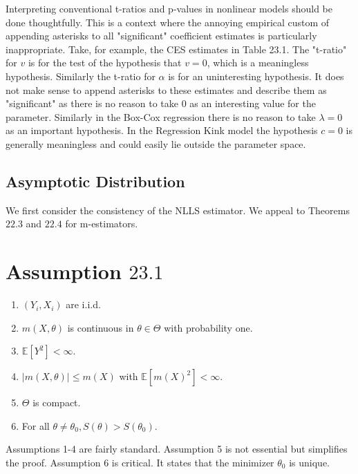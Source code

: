 \documentclass[10pt]{article}
\begin{document}
Interpreting conventional t-ratios and p-values in nonlinear models should be done thoughtfully. This is a context where the annoying empirical custom of appending asterisks to all "significant" coefficient estimates is particularly inappropriate. Take, for example, the CES estimates in Table 23.1. The "t-ratio" for $v$ is for the test of the hypothesis that $v=0$, which is a meaningless hypothesis. Similarly the t-ratio for $\alpha$ is for an uninteresting hypothesis. It does not make sense to append asterisks to these estimates and describe them as "significant" as there is no reason to take 0 as an interesting value for the parameter. Similarly in the Box-Cox regression there is no reason to take $\lambda=0$ as an important hypothesis. In the Regression Kink model the hypothesis $c=0$ is generally meaningless and could easily lie outside the parameter space.

\subsection{Asymptotic Distribution}
We first consider the consistency of the NLLS estimator. We appeal to Theorems $22.3$ and $22.4$ for m-estimators.

\section{Assumption $23.1$}
\begin{enumerate}
  \item $\left(Y_{i}, X_{i}\right)$ are i.i.d.

  \item $m(X, \theta)$ is continuous in $\theta \in \Theta$ with probability one.

  \item $\mathbb{E}\left[Y^{2}\right]<\infty$.

  \item $|m(X, \theta)| \leq m(X)$ with $\mathbb{E}\left[m(X)^{2}\right]<\infty$.

  \item $\Theta$ is compact.

  \item For all $\theta \neq \theta_{0}, S(\theta)>S\left(\theta_{0}\right)$.

\end{enumerate}
Assumptions 1-4 are fairly standard. Assumption 5 is not essential but simplifies the proof. Assumption 6 is critical. It states that the minimizer $\theta_{0}$ is unique.
\end{document}
